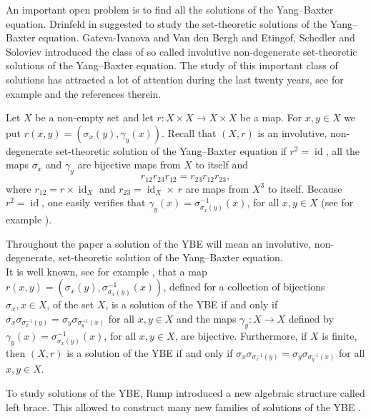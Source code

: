 \documentclass[10pt]{article}
\newcommand{\id}{\operatorname{id}}
\begin{document}
An important open problem is to find all the solutions of the Yang--Baxter equation. Drinfeld in \cite{drinfeld} suggested to study the set-theoretic solutions of the Yang--Baxter equation. Gateva-Ivanova and Van den Bergh \cite{GIVdB} and Etingof, Schedler and Soloviev \cite{ESS} introduced the class of so called involutive non-degenerate set-theoretic solutions of the Yang--Baxter equation. The study of this important class of solutions has attracted a lot of attention during the last twenty years, see for example \cite{CedoSurvey} and the references therein.

Let $X$ be a non-empty set and  let  $r:X\times X \longrightarrow
X\times X$ be a map. For $x,y\in X$ we put $r(x,y) =(\sigma_x (y),
\gamma_y (x))$. Recall that $(X,r)$ is an involutive,
non-degenerate set-theoretic solution of the Yang--Baxter equation
if $r^2=\id$, all the maps $\sigma_x$ and $\gamma_y$ are bijective
maps from $X$ to itself and
  $$r_{12} r_{23} r_{12} =r_{23} r_{12} r_{23},$$
where $r_{12}=r\times \id_X$ and $r_{23}=\id_X\times \ r$ are maps
from $X^3$ to itself. Because $r^{2}=\id$, one easily verifies
that $\gamma_y(x)=\sigma^{-1}_{\sigma_x(y)}(x)$, for all $x,y\in
X$ (see for example \cite[Proposition~1.6]{ESS}).

\bigskip
{} Throughout the paper a solution of the
YBE will mean an involutive, non-degenerate, set-theoretic
solution of the Yang--Baxter equation. \\

It is well known, see for example \cite[Proposition
8.2]{CedoSurvey}, that a map $r(x,y) = (\sigma_x (y),
\sigma^{-1}_{\sigma_x(y)}(x))$, defined for a collection of
bijections $\sigma_x, x\in X$, of the set $X$, is a solution of
the YBE if and only if
$\sigma_{x}\sigma_{\sigma_{x}^{-1}(y)}=\sigma_{y}\sigma_{\sigma_{y}^{-1}(x)}$
for all $x,y\in X$ and the maps $\gamma_y\colon X\rightarrow X$
defined by $\gamma_y(x)=\sigma^{-1}_{\sigma_x(y)}(x)$, for all
$x,y\in X$, are bijective. Furthermore, if $X$ is finite, then
$(X,r)$ is a solution of the YBE if and only if
$\sigma_{x}\sigma_{\sigma_{x}^{-1}(y)}=\sigma_{y}\sigma_{\sigma_{y}^{-1}(x)}$
    for all $x,y\in X$.

 To study solutions of the YBE, Rump \cite{R07} introduced a new algebraic structure called left brace. This allowed to construct many new families of solutions of the YBE \cite{BCJ,BCJO,BCV,CJOComm,GI18,Smok}.
\end{document}
